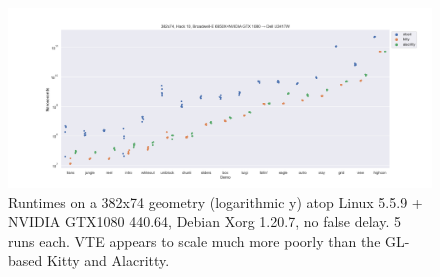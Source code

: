 \begin{figure}[!htb]
\centering
\includegraphics[width=1\textwidth]{media/d0-large-nvidia.png}
\caption[382x74 NVIDIA GTX 1080 benchmarks.]{Runtimes on a 382x74 geometry (logarithmic y) atop Linux 5.5.9 + NVIDIA GTX1080 440.64, Debian Xorg 1.20.7, no false delay. 5 runs each. VTE appears to scale much more poorly than the GL-based Kitty and Alacritty.}
\label{fig:nvidia-secs}
\end{figure}
